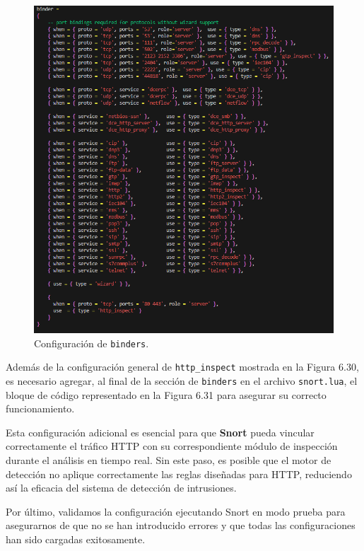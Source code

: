 \documentclass[11pt,a4paper,twoside]{report}
\begin{document}
\begin{figure}[H]
	\centering
	\includegraphics[scale=0.45]{http_inspect/5.png}
	\caption{Configuración de \texttt{binders}.}
\end{figure}



Además de la configuración general de \texttt{http\_inspect} mostrada en la Figura 6.30, es necesario agregar, al final de la sección de \texttt{binders} en el archivo \texttt{snort.lua}, el bloque de código representado en la Figura 6.31 para asegurar su correcto funcionamiento.
\newline

Esta configuración adicional es esencial para que \textbf{Snort} pueda vincular correctamente el tráfico HTTP con su correspondiente módulo de inspección durante el análisis en tiempo real. Sin este paso, es posible que el motor de detección no aplique correctamente las reglas diseñadas para HTTP, reduciendo así la eficacia del sistema de detección de intrusiones.
\newline

Por último, validamos la configuración ejecutando Snort en modo prueba para asegurarnos de que no se han introducido errores y que todas las configuraciones han sido cargadas exitosamente.
\end{document}
